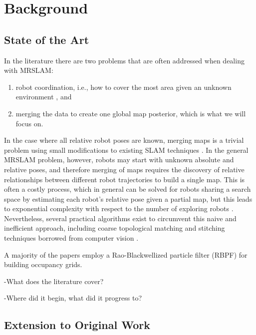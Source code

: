 \section{Background}
\label{S:Back}

\subsection{State of the Art}
\label{SS:Back:SOA}
    
In the literature there are two problems that are often addressed when dealing with MRSLAM:
\begin{enumerate}
\item robot coordination, i.e., how to cover the most area given an unknown environment \cite{julia2012comparison}, and
\item merging the data to create one global map posterior, which is what we will focus on.
\end{enumerate}

In the case where all relative robot poses are known, merging maps is a trivial problem using small modifications to existing SLAM techniques \cite{thrun2001probabilistic}. In the general MRSLAM problem, however, robots may start with unknown absolute and relative poses, and therefore merging of maps requires the discovery of relative relationships between different robot trajectories to build a single map. This is often a costly process, which in general can be solved for robots sharing a search space by estimating each robot's relative pose given a partial map, but this leads to exponential complexity with respect to the number of exploring robots \cite{fox2006distributed}. Nevertheless, several practical algorithms exist to circumvent this naive and inefficient approach,  including coarse topological matching and stitching techniques borrowed from computer vision \cite{birk2006merging}.


A majority of the papers employ a Rao-Blackwellized particle filter (RBPF) for building occupancy grids.  


\cite{howard2006multi,birk2006merging,lazaro2013multi,lee2012probabilistic}


-What does the literature cover?

-Where did it begin, what did it progress to?




\subsection{\cite{howard2006multi} Extension to Original Work}
\label{SS:Back:Contributions}

